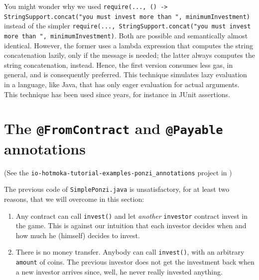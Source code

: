 \begin{commentbox}
You might wonder why we used
\texttt{require(..., () -> StringSupport.concat("you must invest more than ", minimumInvestment)}
instead of the simpler
\texttt{require(..., StringSupport.concat("you must invest more than ", minimumInvestment)}.
Both are possible and semantically almost identical. However, the former
uses a lambda expression that computes the string concatenation lazily, only if
the message is needed; the latter always computes the string concatenation, instead.
Hence, the first version consumes less gas, in general, and is consequently
preferred. This technique simulates lazy evaluation in a language, like
Java, that has only eager evaluation for actual arguments. This technique
has been used since years, for instance in JUnit assertions.
\end{commentbox}

\section{The \texttt{@FromContract} and \texttt{@Payable} annotations}\label{sec:from_contract_payable}

\begin{center}
(See the \texttt{io-hotmoka-tutorial-examples-ponzi\_annotations} project in \hotmokaRepo{})
\end{center}

The previous code of \texttt{SimplePonzi.java} is unsatisfactory, for at least two
reasons, that we will overcome in this section:

\begin{enumerate}
\item Any contract can call \texttt{invest()} and let \emph{another} \texttt{investor}
  contract invest
  in the game. This is against our intuition that each investor decides when
  and how much he (himself) decides to invest.
\item There is no money transfer. Anybody can call \texttt{invest()}, with an arbitrary
  \texttt{amount} of coins. The previous investor does not get the investment back
  when a new investor arrives since, well, he never really invested anything.
\end{enumerate}

